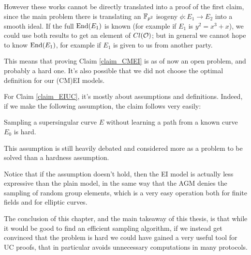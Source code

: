 However these works cannot be directly translated into a proof of the first claim, since the main problem there is translating an $\mathbb{F}_{p^2}$ isogeny $\phi: E_1\to E_2$ into a smooth ideal. If the full $\operatorname{End}(E_1)$ is known (for example if $E_1$ is $y^2=x^3+x$), we could use both results to get an element of $Cl(\mathcal{O})$; but in general we cannot hope to know $\operatorname{End}(E_1)$, for example if $E_1$ is given to us from another party.

This means that proving Claim \ref{claim_CMEI} is as of now an open problem, and probably a hard one. It's also possible that we did not choose the optimal definition for our (CM)EI models.

For Claim \ref{claim_EIUC}, it's mostly about assumptions and definitions. Indeed, if we make the following assumption, the claim follows very easily:
\begin{assumption}
    Sampling a supersingular curve $E$ without learning a path from a known curve $E_0$ is hard.
\end{assumption}
This assumption is still heavily debated and considered more as a problem to be solved than a hardness assumption.

Notice that if the assumption doesn't hold, then the EI model is actually less expressive than the plain model, in the same way that the AGM denies the sampling of random group elements, which is a very easy operation both for finite fields and for elliptic curves.

The conclusion of this chapter, and the main takeaway of this thesis, is that while it would be good to find an efficient sampling algorithm, if we instead get convinced that the problem is hard we could have gained a very useful tool for UC proofs, that in particular avoids unnecessary computations in many protocols.



